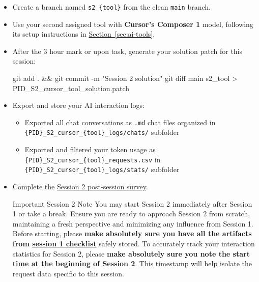 \documentclass[11pt, a4paper]{article}
\begin{document}
\begin{itemize}
    \item Create a branch named \texttt{s2\_\{tool\}} from the clean \texttt{main} branch.
    \item Use your second assigned tool with \textbf{Cursor's Composer 1} model, following its setup instructions in \hyperref[sec:ai-tools]{Section~\ref*{sec:ai-tools}}.
    \item After the 3 hour mark or upon task, generate your solution patch for this session:
    \begin{codebox}
git add . && git commit -m "Session 2 solution"     
git diff main s2_{tool} > {PID}_S2_cursor_{tool}_solution.patch
    \end{codebox}
    \item Export and store your AI interaction logs:
    \begin{itemize}
        \item Exported all chat conversations as \texttt{.md} chat files\newline
        organized in \texttt{\{PID\}\_S2\_cursor\_\{tool\}\_logs/chats/} subfolder
        \item Exported and filtered your token usage as \texttt{\{PID\}\_S2\_cursor\_\{tool\}\_requests.csv} in \texttt{\{PID\}\_S2\_cursor\_\{tool\}\_logs/stats/} subfolder
    \end{itemize}
    \item Complete the \href{https://forms.gle/dPJY5vYg6XwU4T5b8}{Session 2 post-session survey}.
    
    \begin{mainbox}{Important Session 2 Note}
        You may start Session 2 immediately after Session 1 or take a break. Ensure you are ready to approach Session 2 from scratch, maintaining a fresh perspective and minimizing any influence from Session 1. Before starting, please \textbf{make absolutely sure you have all the artifacts from \hyperref[sec:session-1-checklist]{session 1 checklist}} safely stored.\newline\newline
        To accurately track your interaction statistics for Session 2, please \textbf{make absolutely sure you note the start time at the beginning of Session 2}. This timestamp will help isolate the request data specific to this session.
    \end{mainbox}
\end{itemize}
\end{document}
